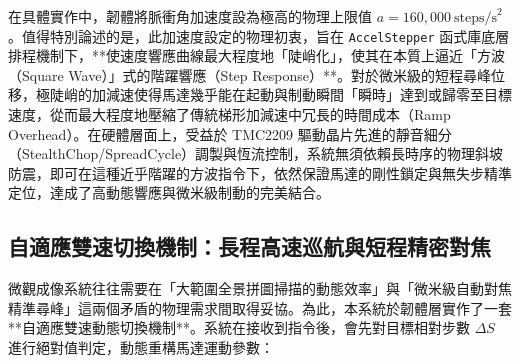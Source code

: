 在具體實作中，韌體將脈衝角加速度設為極高的物理上限值 $a = 160,000~\text{steps/s}^2$。值得特別論述的是，此加速度設定的物理初衷，旨在 \texttt{AccelStepper} 函式庫底層排程機制下，**使速度響應曲線最大程度地「陡峭化」，使其在本質上逼近「方波（Square Wave）」式的階躍響應（Step Response）**。對於微米級的短程尋峰位移，極陡峭的加減速使得馬達幾乎能在起動與制動瞬間「瞬時」達到或歸零至目標速度，從而最大程度地壓縮了傳統梯形加減速中冗長的時間成本（Ramp Overhead）。在硬體層面上，受益於 TMC2209 驅動晶片先進的靜音細分（StealthChop/SpreadCycle）調製與恆流控制，系統無須依賴長時序的物理斜坡防震，即可在這種近乎階躍的方波指令下，依然保證馬達的剛性鎖定與無失步精準定位，達成了高動態響應與微米級制動的完美結合。

\subsection{自適應雙速切換機制：長程高速巡航與短程精密對焦}

微觀成像系統往往需要在「大範圍全景拼圖掃描的動態效率」與「微米級自動對焦精準尋峰」這兩個矛盾的物理需求間取得妥協。為此，本系統於韌體層實作了一套**自適應雙速動態切換機制**。系統在接收到指令後，會先對目標相對步數 $\Delta S$ 進行絕對值判定，動態重構馬達運動參數：

